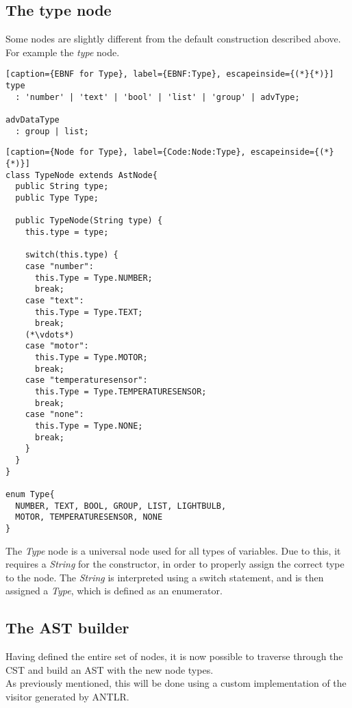 \subsection*{The type node}
Some nodes are slightly different from the default construction described above. For example the \textit{type} node. 
\begin{lstlisting}[caption={EBNF for Type}, label={EBNF:Type}, escapeinside={(*}{*)}]
type        
  : 'number' | 'text' | 'bool' | 'list' | 'group' | advType;
  
advDataType    
  : group | list;
\end{lstlisting}

\begin{lstlisting}[caption={Node for Type}, label={Code:Node:Type}, escapeinside={(*}{*)}]
class TypeNode extends AstNode{
  public String type;
  public Type Type;
	
  public TypeNode(String type) {
    this.type = type;
	
    switch(this.type) {
    case "number":
      this.Type = Type.NUMBER;
      break;
    case "text":
      this.Type = Type.TEXT;
      break;
    (*\vdots*)
    case "motor":
      this.Type = Type.MOTOR;
      break;
    case "temperaturesensor":
      this.Type = Type.TEMPERATURESENSOR;
      break;
    case "none":
      this.Type = Type.NONE;
      break;
    }
  }
}

enum Type{
  NUMBER, TEXT, BOOL, GROUP, LIST, LIGHTBULB, 
  MOTOR, TEMPERATURESENSOR, NONE
}
\end{lstlisting}
The \textit{Type} node is a universal node used for all types of variables. Due to this, it requires a \textit{String} for the constructor, in order to properly assign the correct type to the node.
The \textit{String} is interpreted using a switch statement, and is then assigned a \textit{Type}, which is defined as an enumerator. 


\subsection{The AST builder}
Having defined the entire set of nodes, it is now possible to traverse through the CST and build an AST with the new node types.\\
As previously mentioned, this will be done using a custom implementation of the visitor generated by ANTLR.


